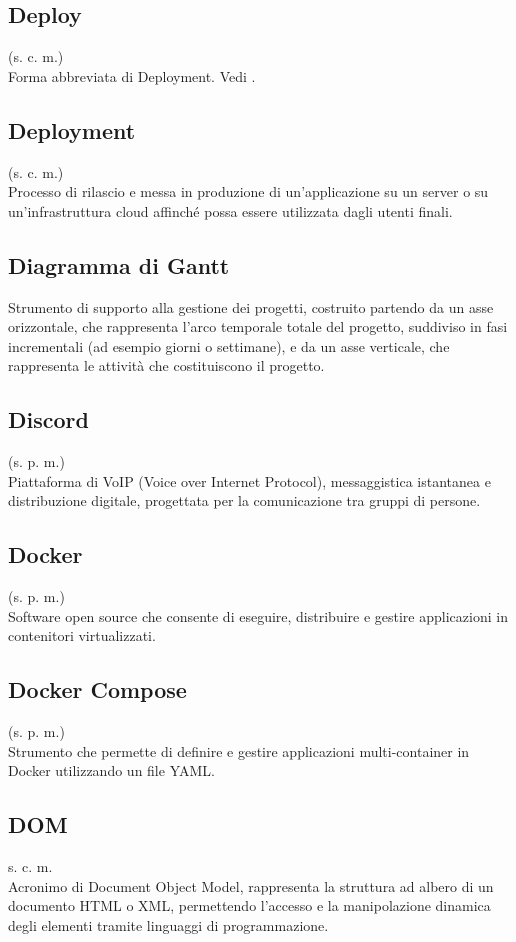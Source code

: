 \subsection{Deploy}
(s. c. m.)\\
Forma abbreviata di Deployment. Vedi .
\subsection{Deployment}
(s. c. m.)\\
Processo di rilascio e messa in produzione di un'applicazione su un
server o su un'infrastruttura cloud affinché possa essere utilizzata dagli utenti finali.
\subsection{Diagramma di Gantt}
Strumento di supporto alla gestione dei progetti, costruito partendo da un asse
orizzontale, che rappresenta l'arco temporale totale del progetto, suddiviso in
fasi incrementali (ad esempio giorni o settimane), e da un asse verticale, che
rappresenta le attività che costituiscono il progetto.
\subsection{Discord}
(s. p. m.)\\
Piattaforma di VoIP (Voice over Internet Protocol), messaggistica istantanea
e distribuzione digitale, progettata per la comunicazione tra gruppi di persone.
\subsection{Docker}
(s. p. m.)\\
Software open source che consente di eseguire, distribuire e gestire
applicazioni in contenitori virtualizzati.
\subsection{Docker Compose}
(s. p. m.)\\
Strumento che permette di definire e gestire applicazioni multi-container in Docker
utilizzando un file YAML.
\subsection{DOM}
{s. c. m.}\\
Acronimo di Document Object Model, rappresenta la struttura ad albero di un documento
HTML o XML, permettendo l'accesso e la manipolazione dinamica degli elementi tramite linguaggi
di programmazione.
